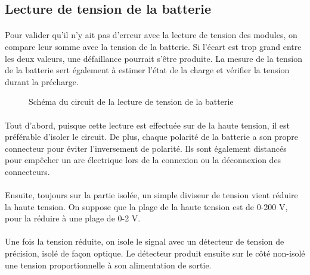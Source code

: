 \subsection{Lecture de tension de la batterie}
	\paragraph*{}
	Pour valider qu'il n'y ait pas d'erreur avec la lecture de tension des modules, on compare leur somme avec la tension de la batterie. Si l'écart est trop grand entre les deux valeurs, une défaillance pourrait s'être produite. La mesure de la tension de la batterie sert également à estimer l'état de la charge et vérifier la tension durant la précharge. 
	
	\begin{figure}[H]
		\centering
		\caption{Schéma du circuit de la lecture de tension de la batterie}
		\label{fig:schemalecturetension}
	\end{figure}	

	\paragraph*{}
	Tout d'abord, puisque cette lecture est effectuée sur de la haute tension, il est préférable d'isoler le circuit. De plus, chaque polarité de la batterie a son propre connecteur pour éviter l'inversement de polarité. Ils sont également distancés pour empêcher un arc électrique lors de la connexion ou la déconnexion des connecteurs.
	
	\paragraph*{}
	Ensuite, toujours sur la partie isolée, un simple diviseur de tension vient réduire la haute tension. On suppose que la plage de la haute tension est de 0-200 V, pour la réduire à une plage de 0-2 V.
	
	\paragraph*{}
	Une fois la tension réduite, on isole le signal avec un détecteur de tension de précision, isolé de façon optique. Le détecteur produit ensuite sur le côté non-isolé une tension proportionnelle à son alimentation de sortie.
	
